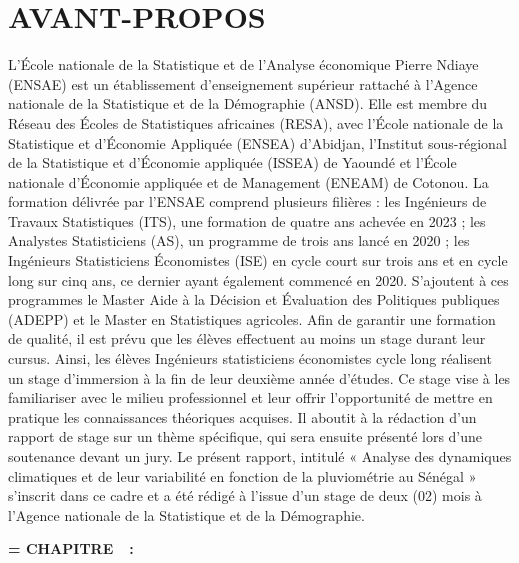 \documentclass[12pt,a4paper]{report}
\begin{document}
\chapter*{AVANT-PROPOS}
L’École nationale de la Statistique et de l’Analyse économique Pierre Ndiaye (ENSAE) est un établissement d’enseignement supérieur rattaché à l’Agence nationale de la Statistique et de la Démographie (ANSD). Elle est membre du Réseau des Écoles de Statistiques africaines (RESA), avec l’École nationale de la Statistique et d’Économie Appliquée (ENSEA) d’Abidjan, l’Institut sous-régional de la Statistique et d’Économie appliquée (ISSEA) de Yaoundé et l’École nationale d’Économie appliquée et de Management (ENEAM) de Cotonou. La formation délivrée par l’ENSAE comprend plusieurs filières : les Ingénieurs de Travaux Statistiques (ITS), une formation de quatre ans achevée en 2023 ; les Analystes Statisticiens (AS), un programme de trois ans lancé en 2020 ; les Ingénieurs Statisticiens Économistes (ISE) en cycle court sur trois ans et en cycle long sur cinq ans, ce dernier ayant également commencé en 2020. S'ajoutent à ces programmes le Master Aide à la Décision et Évaluation des Politiques publiques (ADEPP) et le Master en Statistiques agricoles. Afin de garantir une formation de qualité, il est prévu que les élèves effectuent au moins un stage durant leur cursus. Ainsi, les élèves Ingénieurs statisticiens économistes cycle long réalisent un stage d’immersion à la fin de leur deuxième année d’études. Ce stage vise à les familiariser avec le milieu professionnel et leur offrir l’opportunité de mettre en pratique les connaissances théoriques acquises. Il aboutit à la rédaction d’un rapport de stage sur un thème spécifique, qui sera ensuite présenté lors d'une soutenance devant un jury. Le présent rapport, intitulé « Analyse des dynamiques climatiques et de leur variabilité en fonction de la pluviométrie au Sénégal » s’inscrit dans ce cadre et a été rédigé à l’issue d’un stage de deux (02) mois à l’Agence nationale de la Statistique et de la Démographie.

\clearpage
{}
{}
\renewcommand{\contentsname}{SOMMAIRE}
\begingroup
\newlength{\sommairechapterindent}
\settowidth{\sommairechapterindent}{\bfseries CHAPITRE~IV~:\enspace}
  {}
  {}
  {\noindent
   \bfseries
   \etocifnumbered
     {\hangindent=\sommairechapterindent{}%
      {\color{navyblue}CHAPITRE~\etocnumber{}~:}\enspace\etocname}
     {\hangindent=0pt\etocname}%
   \nobreak\dotfill\nobreak\makebox[2.5em][r]{\etocpage}\par
   \normalfont}
  {}
\tableofcontents
\endgroup
\end{document}
